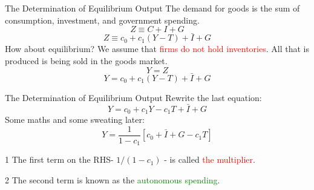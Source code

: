 \documentclass[shownotes,11pt, aspectratio=169]{beamer}
\newenvironment{wideitemize}{\itemize\addtolength{\itemsep}{10pt}}{\enditemize}
\begin{document}
\begin{frame}{The Determination of Equilibrium Output}
The demand for goods is the sum of consumption, investment, and government spending.
\[ Z \equiv C + I + G \]
\pause
\[ Z \equiv c_0 + c_1(Y - T) + \bar{I} + G \]
\pause
How about equilibrium? We assume that \textcolor{red}{firms do not hold inventories}. All that is produced is being sold in the goods market.
\pause
\[ Y = Z \]
\pause
\[ Y = c_0 + c_1(Y - T) + \bar{I} + G \]
\end{frame}

\begin{frame}{The Determination of Equilibrium Output}
Rewrite the last equation:
\[ Y = c_0 + c_1Y - c_1T + \bar{I} + G \]
\pause
Some maths and some sweating later:
\[ Y = \frac{1}{1 - c_1}[c_0 + \bar{I} + G - c_1T] \]
\pause
\begin{wideitemize}
\item[1] The first term on the RHS- $1/(1 - c_1)$ - is called \textcolor{red}{the multiplier}.
\item[2] The second term is known as the \textcolor{green}{autonomous spending}.
\end{wideitemize}
\end{frame}
\end{document}
